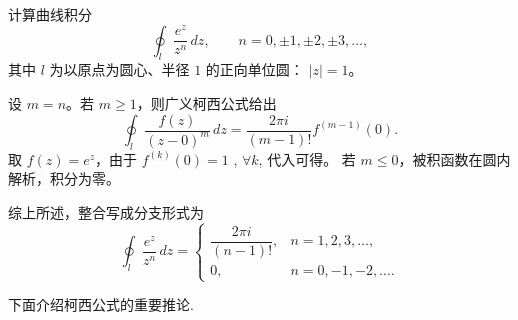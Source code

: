 \begin{example}
计算曲线积分
\[
\oint_{l}\frac{e^{z}}{z^{n}}\,dz,\qquad n=0,\pm1,\pm2,\pm3,\dots,
\]
其中 \(l\) 为以原点为圆心、半径 \(1\) 的正向单位圆： \(|z|=1\)。
\end{example}



\begin{solution}

设 \(m=n\)。若 \(m\ge1\)，则广义柯西公式给出
\[
\oint_{l}\frac{f(z)}{(z-0)^{m}}\,dz=\frac{2\pi i}{(m-1)!}f^{(m-1)}(0).
\]
取 \(f(z)=e^{z}\)，由于 \(f^{(k)}(0)=1\) , $\forall k$,  代入可得。
若 \(m\le0\)，被积函数在圆内解析，积分为零。

综上所述，整合写成分支形式为
\[
\oint_{l}\frac{e^{z}}{z^{n}}\,dz=
\begin{cases}
\dfrac{2\pi i}{(n-1)!}, & n=1,2,3,\dots,\\[6pt]
0, & n=0,-1,-2,\dots .
\end{cases}
\]
\end{solution}



下面介绍柯西公式的重要推论.

